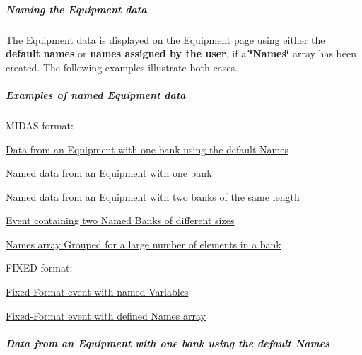  \par
 \hypertarget{RC_mhttpd_Equipment_page_RC_mhttpd_Equipment_Naming}{}\subparagraph{Naming the Equipment data}\label{RC_mhttpd_Equipment_page_RC_mhttpd_Equipment_Naming}
The Equipment data is \hyperlink{RC_mhttpd_Equipment_page_RC_mhttpd_Equipment_var}{displayed on the Equipment page} using either the {\bfseries default} {\bfseries names} or {\bfseries names assigned by the user}, if a {\bfseries \char`\"{}Names\char`\"{}} array has been created. The following examples illustrate both cases.\hypertarget{RC_mhttpd_Equipment_page_RC_mhttpd_Equipment_Examples}{}\subparagraph{Examples of named Equipment data}\label{RC_mhttpd_Equipment_page_RC_mhttpd_Equipment_Examples}

\begin{DoxyItemize}
\item MIDAS format:
\begin{DoxyItemize}
\item \hyperlink{RC_mhttpd_Equipment_page_RC_mhttpd_Equipment_example1}{Data from an Equipment with one bank using the default Names}
\item \hyperlink{RC_mhttpd_Equipment_page_RC_mhttpd_Equipment_example2}{Named data from an Equipment with one bank}
\item \hyperlink{RC_mhttpd_Equipment_page_RC_mhttpd_Equipment_example3}{Named data from an Equipment with two banks of the same length}
\item \hyperlink{RC_mhttpd_Equipment_page_RC_mhttpd_Equipment_example4}{Event containing two Named Banks of different sizes}
\item \hyperlink{RC_mhttpd_Equipment_page_RC_mhttpd_Equipment_example5}{Names array Grouped for a large number of elements in a bank}
\end{DoxyItemize}
\item FIXED format:
\begin{DoxyItemize}
\item \hyperlink{RC_mhttpd_Equipment_page_RC_mhttpd_Equipment_example6}{Fixed-\/Format event with named Variables}
\item \hyperlink{RC_mhttpd_Equipment_page_RC_mhttpd_Equipment_example7}{Fixed-\/Format event with defined Names array} \par

\end{DoxyItemize}
\end{DoxyItemize}\hypertarget{RC_mhttpd_Equipment_page_RC_mhttpd_Equipment_example1}{}\subparagraph{Data from an Equipment with one bank using the default Names}\label{RC_mhttpd_Equipment_page_RC_mhttpd_Equipment_example1}
